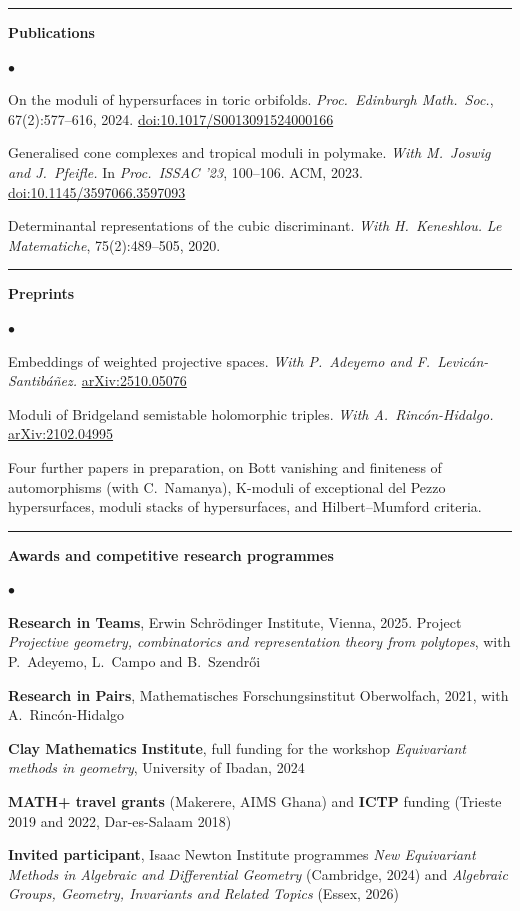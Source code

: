 \documentclass[10pt]{article}
\newcommand{\cvsection}[1]{%
  \par\vspace{0.24cm}%
  \noindent\rule{\textwidth}{0.4pt}%
  \par\vspace{0.10cm}%
  \noindent\textbf{\large #1}%
  \par\vspace{0.10cm}%
}
\newenvironment{cvlist}%
  {\begin{list}{$\bullet$}{%
     \setlength{\leftmargin}{1.1em}\setlength{\labelwidth}{0.8em}%
     \setlength{\itemsep}{0.10cm}\setlength{\parsep}{0pt}%
     \setlength{\topsep}{0pt}\setlength{\partopsep}{0pt}}}%
  {\end{list}}
\begin{document}
\cvsection{Publications}
\begin{cvlist}
\item On the moduli of hypersurfaces in toric orbifolds.
{\em Proc.\ Edinburgh Math.\ Soc.}, 67(2):577--616, 2024.
\href{https://doi.org/10.1017/S0013091524000166}{doi:10.1017/S0013091524000166}
\item Generalised cone complexes and tropical moduli in polymake.
{\em With M.\ Joswig and J.\ Pfeifle.} In {\em Proc.\ ISSAC '23}, 100--106. ACM, 2023.
\href{https://dl.acm.org/doi/abs/10.1145/3597066.3597093}{doi:10.1145/3597066.3597093}
\item Determinantal representations of the cubic discriminant.
{\em With H.\ Keneshlou.} {\em Le Matematiche}, 75(2):489--505, 2020.
\end{cvlist}

\cvsection{Preprints}
\begin{cvlist}
\item Embeddings of weighted projective spaces.
{\em With P.\ Adeyemo and F.\ Levic\'an-Santib\'a\~nez.}
\href{https://arxiv.org/abs/2510.05076}{arXiv:2510.05076}
\item Moduli of Bridgeland semistable holomorphic triples.
{\em With A.\ Rinc\'on-Hidalgo.}
\href{https://arxiv.org/abs/2102.04995}{arXiv:2102.04995}
\end{cvlist}
{\small Four further papers in preparation, on Bott vanishing and finiteness of
automorphisms (with C.\ Namanya), K-moduli of exceptional del Pezzo
hypersurfaces, moduli stacks of hypersurfaces, and Hilbert--Mumford criteria.}

\cvsection{Awards and competitive research programmes}
\begin{cvlist}
\item {\bf Research in Teams}, Erwin Schr\"odinger Institute, Vienna, 2025.
Project {\em Projective geometry, combinatorics and representation theory from
polytopes}, with P.\ Adeyemo, L.\ Campo and B.\ Szendr\H{o}i
\item {\bf Research in Pairs}, Mathematisches Forschungsinstitut Oberwolfach,
2021, with A.\ Rinc\'on-Hidalgo
\item {\bf Clay Mathematics Institute}, full funding for the workshop
{\em Equivariant methods in geometry}, University of Ibadan, 2024
\item {\bf MATH+ travel grants} (Makerere, AIMS Ghana) and {\bf ICTP} funding
(Trieste 2019 and 2022, Dar-es-Salaam 2018)
\item {\bf Invited participant}, Isaac Newton Institute programmes
{\em New Equivariant Methods in Algebraic and Differential Geometry}
(Cambridge, 2024) and {\em Algebraic Groups, Geometry, Invariants and Related
Topics} (Essex, 2026)
\end{cvlist}
\end{document}

